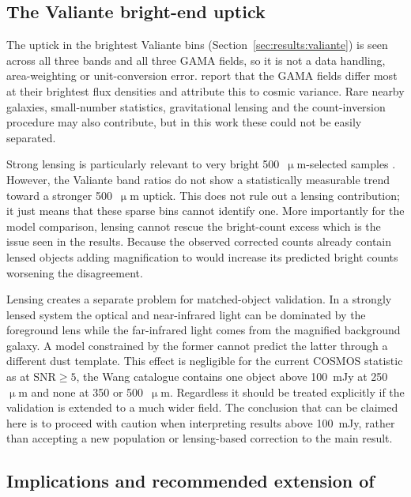 \documentclass[12pt,a4paper]{article}
\begin{document}
\subsection{The Valiante bright-end uptick}
\label{sec:discussion:valiante}

The uptick in the brightest Valiante bins (Section~\ref{sec:results:valiante}) is seen
across all three bands and all three GAMA fields, so it is not a data handling,
area-weighting or unit-conversion error. \citet{Valiante_2016} report that the GAMA
fields differ most at their brightest flux densities and attribute this to cosmic
variance. Rare nearby galaxies, small-number statistics, gravitational lensing and the
count-inversion procedure may also contribute, but in this work these could not be easily separated.

Strong lensing is particularly relevant to very bright 500~$\upmu$m-selected samples
\citep{B_thermin_2017,Negrello_2017}. However, the Valiante band ratios do not show a
statistically measurable trend toward a stronger 500~$\upmu$m uptick. This does not rule
out a lensing contribution; it just means that these sparse bins cannot identify
one. More importantly for the model comparison, lensing cannot rescue the bright-count
excess which is the issue seen in the results. Because the observed corrected counts already contain lensed objects adding magnification to \popcosmos{} would increase its predicted bright counts worsening the disagreement.

Lensing creates a separate problem for matched-object validation. In a
strongly lensed system the optical and near-infrared light can be dominated by the
foreground lens while the far-infrared light comes from the magnified background
galaxy. A model constrained by the former cannot predict the latter through a different
dust template. This effect is negligible for the current COSMOS statistic as at
$\mathrm{SNR}\geq5$, the Wang catalogue contains one object above \SI{100}{mJy} at
250~$\upmu$m and none at 350 or 500~$\upmu$m. Regardless it should be treated
explicitly if the validation is extended to a much wider field. The conclusion that can be claimed here is to proceed with caution when interpreting results above \SI{100}{mJy}, rather than accepting a new population or lensing-based correction to the main result.


\subsection{Implications and recommended extension of \popcosmos{}}
\label{sec:discussion:recommendations}
\end{document}
